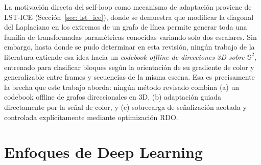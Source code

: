         La motivación directa del self-loop como mecanismo de adaptación proviene de
        LST-ICE (Sección~\ref{sec: lst_ice}), donde se demuestra que modificar la diagonal
        del Laplaciano en los extremos de un grafo de línea permite generar toda una familia
        de transformadas paramétricas conocidas variando solo dos escalares. Sin embargo,
        hasta donde se pudo determinar en esta revisión, ningún trabajo de la literatura
        extiende esa idea hacia un \emph{codebook offline de direcciones 3D sobre
        $\mathbb{S}^2$}, entrenado para clasificar bloques según la orientación de su
        gradiente de color y generalizable entre frames y secuencias de la misma escena.
        Esa es precisamente la brecha que este trabajo aborda: ningún método revisado
        combina (a) un codebook offline de grafos direccionales en 3D, (b) adaptación
        guiada directamente por la señal de color, y (c) sobrecarga de señalización
        acotada y controlada explícitamente mediante optimización RDO.


\section{Enfoques de Deep Learning}

